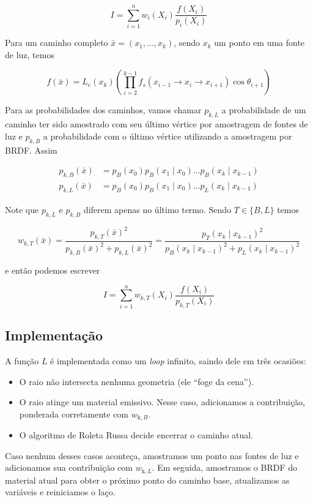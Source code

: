 \[
  I = \sum_{i=1}^n w_i(X_{i}) \frac{f(X_i)}{p_i(X_i)}
\]

Para um caminho completo $\bar{x} = (x_1, \ldots, x_k)$, sendo $x_k$ um ponto
em uma fonte de luz, temos

\[
  f(\bar{x}) = L_e(x_{k}) \left( \prod_{i=2}^{k-1} f_s(x_{i-1} \rightarrow
  x_{i} \rightarrow x_{i+1}) \cos \theta_{i+1} \right) 
\]

Para as probabilidades dos caminhos, vamos chamar $p_{k,L}$ a probabilidade de
um caminho ter sido amostrado com seu último vértice por amostragem de fontes
de luz e $p_{k,B}$ a probabilidade com o último vértice utilizando a amostragem
por BRDF. Assim

\begin{align*}
  p_{k,B}(\bar{x}) &= p_B(x_0)p_B(x_1 \mid x_0) \ldots p_B(x_k \mid x_{k-1})\\
  p_{k,L}(\bar{x}) &= p_B(x_0)p_B(x_1 \mid x_0) \ldots p_L(x_k \mid x_{k-1})
\end{align*}

Note que $p_{k,L}$ e $p_{k,B}$ diferem apenas no último termo. Sendo $T \in \{B, L\}$ temos

\[
  w_{k,T}(\bar{x}) = \frac{p_{k,T}(\bar{x})^2}{p_{k,B}(\bar{x})^2 +
  p_{k,L}(\bar{x})^2} = \frac{p_T(x_k \mid x_{k-1})^2}{p_B(x_k \mid x_{k-1})^2
  + p_L(x_k \mid x_{k-1})^2}
\]

e então podemos escrever

\[
  I = \sum_{i=1}^n w_{k,T}(X_{i}) \frac{f(X_i)}{p_{k,T}(X_i)}
\]

\subsection{Implementação}

A função $L$ é implementada como um \emph{loop} infinito, saindo dele em três
ocasiões:

\begin{itemize}
  \item O raio não intersecta nenhuma geometria (ele ``foge da cena'').
  \item O raio atinge um material emissivo. Nesse caso, adicionamos a
    contribuição, ponderada corretamente com $w_{\text{k},B}$.
  \item O algoritmo de Roleta Russa decide encerrar o caminho atual.
\end{itemize}

Caso nenhum desses casos aconteça, amostramos um ponto nas fontes de luz e
adicionamos sua contribuição com $w_{\text{k}, L}$. Em seguida, amostramos o
BRDF do material atual para obter o próximo ponto do caminho base, atualizamos
as variáveis e reiniciamos o laço.

